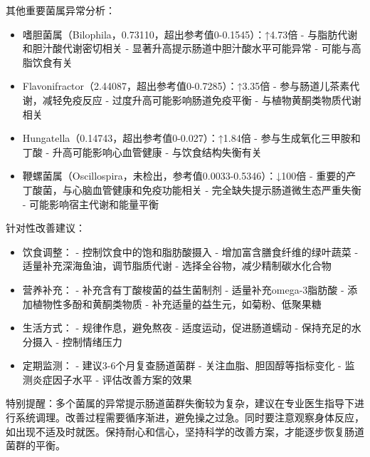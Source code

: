 \documentclass[UTF8]{ctexart}
\begin{document}
\begin{tcolorbox}[
    enhanced,
    colback=gray!3,
    colframe=gray!3,
    arc=3mm,
    boxrule=0pt,
    width=\textwidth,
    top=8pt,
    bottom=8pt
    ]
{\small{\textcolor{yellow!85!orange}{\faLightbulb}}\quad 其他重要菌属异常分析：
\begin{itemize}
\item 嗜胆菌属（Bilophila，0.73110，超出参考值0-0.1545）：↑4.73倍
    - 与脂肪代谢和胆汁酸代谢密切相关
    - 显著升高提示肠道中胆汁酸水平可能异常
    - 可能与高脂饮食有关

\item Flavonifractor（2.44087，超出参考值0-0.7285）：↑3.35倍
    - 参与肠道儿茶素代谢，减轻免疫反应
    - 过度升高可能影响肠道免疫平衡
    - 与植物黄酮类物质代谢相关

\item Hungatella（0.14743，超出参考值0-0.027）：↑1.84倍
    - 参与生成氧化三甲胺和丁酸
    - 升高可能影响心血管健康
    - 与饮食结构失衡有关

\item 鞭螺菌属（Oscillospira，未检出，参考值0.0033-0.5346）：↓100倍
    - 重要的产丁酸菌，与心脑血管健康和免疫功能相关
    - 完全缺失提示肠道微生态严重失衡
    - 可能影响宿主代谢和能量平衡
\end{itemize}

{\textcolor{green!85!black}{\faLightbulb}}\quad 针对性改善建议：
\begin{itemize}
\item 饮食调整：
    - 控制饮食中的饱和脂肪酸摄入
    - 增加富含膳食纤维的绿叶蔬菜
    - 适量补充深海鱼油，调节脂质代谢
    - 选择全谷物，减少精制碳水化合物

\item 营养补充：
    - 补充含有丁酸梭菌的益生菌制剂
    - 适量补充omega-3脂肪酸
    - 添加植物性多酚和黄酮类物质
    - 补充适量的益生元，如菊粉、低聚果糖

\item 生活方式：
    - 规律作息，避免熬夜
    - 适度运动，促进肠道蠕动
    - 保持充足的水分摄入
    - 控制情绪压力

\item 定期监测：
    - 建议3-6个月复查肠道菌群
    - 关注血脂、胆固醇等指标变化
    - 监测炎症因子水平
    - 评估改善方案的效果
\end{itemize}

特别提醒：多个菌属的异常提示肠道菌群失衡较为复杂，建议在专业医生指导下进行系统调理。改善过程需要循序渐进，避免操之过急。同时要注意观察身体反应，如出现不适及时就医。保持耐心和信心，坚持科学的改善方案，才能逐步恢复肠道菌群的平衡。
}
\end{tcolorbox}
\end{document}
